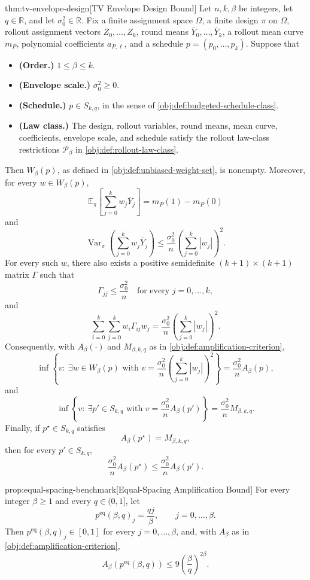 \begin{theoremv}{thm:tv-envelope-design}[TV Envelope Design Bound]
Let \(n,k,\beta\) be integers, let \(q\in\mathbb R\), and let \(\sigma_0^2\in\mathbb R\). Fix a finite assignment space \(\Omega\), a finite design \(\pi\) on \(\Omega\), rollout assignment vectors \(Z_0,\ldots,Z_k\), round means \(\bar Y_0,\ldots,\bar Y_k\), a rollout mean curve \(m_P\), polynomial coefficients \(a_{P,\ell}\), and a schedule \(p=(p_0,\ldots,p_k)\). Suppose that
\begin{itemize}
\item \textbf{(Order.)} \(1\le \beta\le k\).
\item \textbf{(Envelope scale.)} \(\sigma_0^2\ge 0\).
\item \textbf{(Schedule.)} \(p\in S_{k,q}\), in the sense of \cref{obj:def:budgeted-schedule-class}.
\item \textbf{(Law class.)} The design, rollout variables, round means, mean curve, coefficients, envelope scale, and schedule satisfy the rollout law-class restrictions \(\mathcal P_\beta\) in \cref{obj:def:rollout-law-class}.
\end{itemize}
Then \(W_\beta(p)\), as defined in \cref{obj:def:unbiased-weight-set}, is nonempty. Moreover, for every \(w\in W_\beta(p)\),
\[
\mathbb E_\pi\!\left[\sum_{j=0}^k w_j\bar Y_j\right]=m_P(1)-m_P(0)
\]
and
\[
\operatorname{Var}_\pi\!\left(\sum_{j=0}^k w_j\bar Y_j\right)
\le
\frac{\sigma_0^2}{n}\left(\sum_{j=0}^k |w_j|\right)^2 .
\]
For every such \(w\), there also exists a positive semidefinite \((k+1)\times(k+1)\) matrix \(\Gamma\) such that
\[
\Gamma_{jj}\le \frac{\sigma_0^2}{n}\quad\text{for every }j=0,\ldots,k,
\]
and
\[
\sum_{i=0}^k\sum_{j=0}^k w_i\Gamma_{ij}w_j
=
\frac{\sigma_0^2}{n}\left(\sum_{j=0}^k |w_j|\right)^2 .
\]
Consequently, with \(A_\beta(\cdot)\) and \(M_{\beta,k,q}\) as in \cref{obj:def:amplification-criterion},
\[
\inf\left\{
v:\ \exists w\in W_\beta(p)\text{ with }
v=\frac{\sigma_0^2}{n}\left(\sum_{j=0}^k |w_j|\right)^2
\right\}
=
\frac{\sigma_0^2}{n}A_\beta(p),
\]
and
\[
\inf\left\{
v:\ \exists p'\in S_{k,q}\text{ with }
v=\frac{\sigma_0^2}{n}A_\beta(p')
\right\}
=
\frac{\sigma_0^2}{n}M_{\beta,k,q}.
\]
Finally, if \(p^\star\in S_{k,q}\) satisfies
\[
A_\beta(p^\star)=M_{\beta,k,q},
\]
then for every \(p'\in S_{k,q}\),
\[
\frac{\sigma_0^2}{n}A_\beta(p^\star)
\le
\frac{\sigma_0^2}{n}A_\beta(p').
\]
\end{theoremv}

\begin{propositionv}{prop:equal-spacing-benchmark}[Equal-Spacing Amplification Bound]
For every integer $\beta\ge 1$ and every $q\in(0,1]$, let
\[
p^{\mathrm{eq}}(\beta,q)_j=\frac{qj}{\beta},
\qquad j=0,\ldots,\beta .
\]
Then $p^{\mathrm{eq}}(\beta,q)_j\in[0,1]$ for every $j=0,\ldots,\beta$, and, with $A_\beta$ as in \cref{obj:def:amplification-criterion},
\[
A_\beta\!\left(p^{\mathrm{eq}}(\beta,q)\right)
\le
9\left(\frac{\beta}{q}\right)^{2\beta}.
\]
\end{propositionv}

